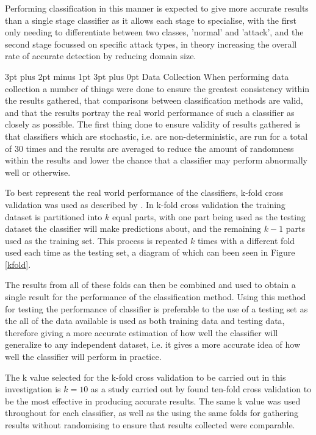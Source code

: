 \documentclass[12pt,a4paper]{article}
\makeatletter
\renewcommand\subsection{\@startsection {subsection}{1}{2mm} %
      {3pt plus 2pt minus 1pt} %
      {3pt plus 0pt} %
      {\normalfont\bfseries}}
\makeatother
\begin{document}
	Performing classification in this manner is expected to give more accurate results than a single stage classifier as it allows each stage to specialise, with the first only needing to differentiate between two classes, 'normal' and 'attack', and the second stage focussed on specific attack types, in theory increasing the overall rate of accurate detection by reducing domain size.

\subsection{Data Collection}
When performing data collection a number of things were done to ensure the greatest consistency within the results gathered, that comparisons between classification methods are valid, and that the results portray the real world performance of such a classifier as closely as possible. The first thing done to ensure validity of results gathered is that classifiers which are stochastic, i.e. are non-deterministic, are run for a total of 30 times and the results are averaged to reduce the amount of randomness within the results and lower the chance that a classifier may perform abnormally well or otherwise.

To best represent the real world performance of the classifiers, k-fold cross validation was used as described by \cite{refaeilzadeh2009cross}. In k-fold cross validation the training dataset is partitioned into $ k $ equal parts, with one part being used as the testing dataset the classifier will make predictions about, and the remaining $ k-1 $ parts used as the training set. This process is repeated $ k $ times with a different fold used each time as the testing set, a diagram of which can been seen in Figure \ref{kfold}. 



The results from all of these folds can then be combined and used to obtain a single result for the performance of the classification method. Using this method for testing the performance of classifier is preferable to the use of a testing set as the all of the data available is used as both training data and testing data, therefore giving a more accurate estimation of how well the classifier will generalize to any independent dataset, i.e. it gives a more accurate idea of how well the classifier will perform in practice.

The k value selected for the k-fold cross validation to be carried out in this investigation is $ k=10 $ as a study carried out by \cite{kohavi1995study} found ten-fold cross validation to be the most effective in producing accurate results. The same k value was used throughout for each classifier, as well as the using the same folds for gathering results without randomising to ensure that results collected were comparable.
\end{document}
